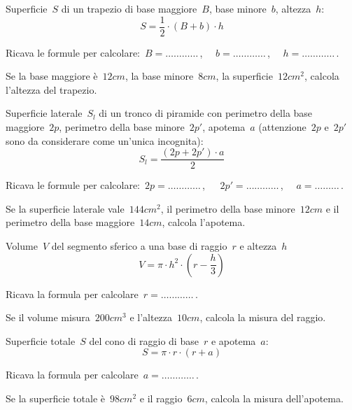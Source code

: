 \begin{esercizio}
\label{ese:20.57}
Superficie~$S$ di un trapezio di base maggiore~$B$, base minore~$b$, 
altezza~$h$:
\begin{equation*}
  S=\frac{1}{2}\cdot (B+b)\cdot h
\end{equation*}

Ricava le formule per calcolare:~$B=\ldots\ldots\ldots\ldots$\,, $\quad 
b=\ldots\ldots\ldots\ldots$\,, $\quad h =\ldots\ldots\ldots\ldots$\,.

Se la base maggiore è~$12\unit{cm}$, la base minore~$8\unit{cm}$, la 
superficie~$12\unit{cm^2}$, calcola l'altezza del trapezio.
\end{esercizio}

\begin{esercizio}
\label{ese:20.58}
Superficie laterale~$S_l$ di un tronco di piramide con perimetro della base 
maggiore~$2p$, perimetro della base minore~$2p'$, apotema~$a$
(attenzione~$2p$ e~$2p'$ sono da considerare come un'unica incognita):
\begin{equation*}
  S_{l}=\frac{(2p+2p')\cdot a}{2}
\end{equation*}

Ricava le formule per calcolare:~$2p=\ldots\ldots\ldots\ldots$\,, 
$\quad~2p'=\ldots\ldots\ldots\ldots$\,, $\quad a =\ldots\ldots\ldots$\,.

Se la superficie laterale vale~$144\unit{cm^2}$, il perimetro della base 
minore~$12\unit{cm}$ e il perimetro della base maggiore~$14\unit{cm}$, 
calcola l'apotema.
\end{esercizio}

\begin{esercizio}
\label{ese:20.59}
Volume~$V$ del segmento sferico a una base di raggio~$r$ e altezza~$h$
\begin{equation*}
  V=\pi \cdot h^{2}\cdot \left(r-\frac{h}{3}\right)
\end{equation*}

Ricava la formula per calcolare~$r=\ldots\ldots\ldots\ldots$\,.

Se il volume misura~$200\unit{cm^3}$ e l'altezza~$10\unit{cm}$, calcola 
la misura del raggio.
\end{esercizio}

\begin{esercizio}
\label{ese:20.60}
Superficie totale~$S$ del cono di raggio di base~$r$ e apotema~$a$:
\begin{equation*}
  S=\pi \cdot r\cdot (r+a)
\end{equation*}

Ricava la formula per calcolare~$a=\ldots\ldots\ldots\ldots$\,.

Se la superficie totale è~$98\unit{cm^2}$ e il raggio~$6\unit{cm}$, calcola 
la misura dell'apotema.
\end{esercizio}

